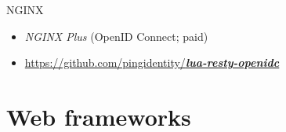 \documentclass[ignorenonframetext,aspectratio=169]{beamer}
\providecommand{\tightlist}{%
  \setlength{\itemsep}{0pt}\setlength{\parskip}{0pt}}
\begin{document}
\begin{frame}[plain]
\centering
{}
\end{frame}

\begin{frame}[fragile]{NGINX}
\begin{itemize}
\tightlist
\item {\em NGINX Plus} (OpenID Connect; paid)
\item \href{https://github.com/pingidentity/lua-resty-openidc}{
    \ttfamily https://github.com/pingidentity/{\large \bfseries \em lua-resty-openidc}}
\end{itemize}
\end{frame}

\section{Web frameworks}
\end{document}
